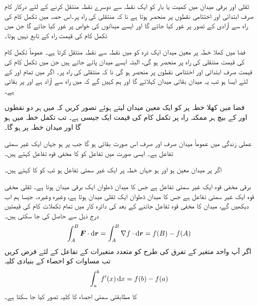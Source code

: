 ثقلی اور برقی میدان میں کمیت یا بار کو ایک نقطہ سے دوسرے نقطہ منتقل کرنے کے لئے درکار کام صرف ابتدائی اور اختتامی نقطوں پر منحصر ہوتا ہے نا کہ منتقلی کی راہ پر۔اس حصہ میں تکمل کام کی راہ سے آزادی کے تصور پر غور کیا جائے گا اور ایسے میدانوں کی خواص پر غور کیا جائے گا جن میں تکمل کام کی قیمت راہ کے تابع نہیں ہوتا۔

فضا میں کھلا خطہ  پر معین میدان  ایک ذرہ کو  میں  نقطہ  سے نقطہ  منتقل کرتا ہے۔ عموماً   تکمل کام  کی قیمت منتقلی کی راہ پر منحصر ہو گی، البتہ ایسے میدان پائے جاتے ہیں جن میں تکمل کام کی قیمت صرف ابتدائی اور اختتامی نقطوں پر منحصر ہو گی نا کہ منتقلی کی راہ پر۔ اگر  میں تمام  اور  کے لئے ایسا ہو تب یہ میدان بقائی میدان کہلائے گا اور ہم کہیں گے کہ  میں  راہ سے آزاد ہے اور  پر  بقائی ہے۔

فضا میں کھلا خطہ  پر  کو ایک  معین میدان لیتے ہوئے تصور کریں کہ  میں ہر دو نقطوں  اور  کے بیچ ہر ممکنہ راہ پر تکمل کام  کی قیمت ایک جیسی ہے۔ تب تکمل  خطہ  میں  ہو گا اور میدان  خطہ  پر  ہو گا۔

عملی زندگی میں عموماً میدان  صرف اور صرف اس صورت بقائی ہو گا جب   پر  ہو جہاں  ایک غیر سمتی تفاعل ہے۔ ایسی صورت میں تفاعل  کو  کا مخفی قوہ تفاعل کہتے ہیں۔   

اگر پر میدان  معین ہو اور  ہو جہاں  خطہ  پر ایک غیر سمتی تفاعل ہو تب  کو  کا  کہتے ہیں۔

برقی مخفی قوہ ایک غیر سمتی تفاعل ہے جس کا میدان ڈھلوان  ایک برقی میدان ہوتا ہے۔  ثقلی مخفی قوہ ایک غیر سمتی تفاعل ہے جس کا میدان ڈھلوان ایک  ثقلی میدان ہوتا ہے، وغیرہ وغیرہ۔ جیسا ہم اب دیکھیں گے،  میدان  کا مخفی قوہ تفاعل  جاننے کے بعد  کی دائرہ کار میں تمام تکملات کام  کی قیمتیں درج ذیل سے حاصل کی جا سکتی ہیں۔
\begin{align}\label{مساوات_سمتی_تکمل_مخفی_قوہ_استعمال}
\int_A^B\kvec{F}\cdot\dif\kvec{r}=\int_A^B\nabla f\cdot\dif \kvec{r}=f(B)-f(A)
\end{align}
اگر آپ واحد متغیر کے تفرق  کی طرح   کو متعدد متغیرات کے تفاعل کے لئے فرض کریں تب مساوات  کو احصاء کے بنیادی کلیہ
\begin{align*}
\int_a^bf'(x)\dif x=f(b)-f(a)
\end{align*}  
کا مطابقتی سمتی احصاء کا کلیہ تصور کیا جا سکتا ہے۔

